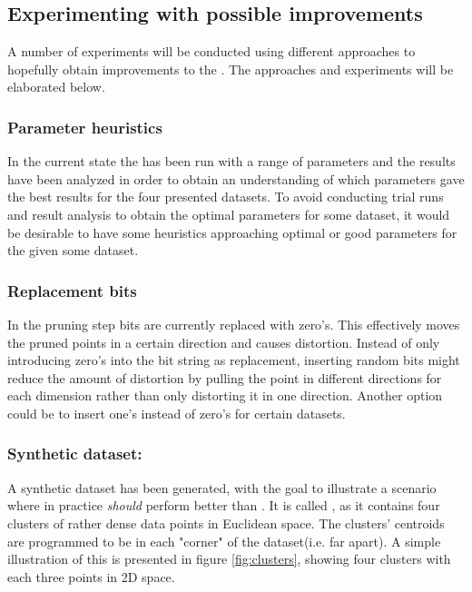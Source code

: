 \subsection{Experimenting with possible improvements}
A number of experiments will be conducted using different approaches to hopefully obtain improvements to the \qs{}. The approaches and experiments will be elaborated below.

\subsubsection{Parameter heuristics}
In the current state the \qs{} has been run with a range of parameters and the results have been analyzed in order to obtain an understanding of which parameters gave the best results for the four presented datasets. To avoid conducting trial runs and result analysis to obtain the optimal parameters for some dataset, it would be desirable to have some heuristics approaching optimal or good parameters for the \qs{} given some dataset.

\subsubsection{Replacement bits}
In the pruning step bits are currently replaced with zero's. This effectively moves the pruned points in a certain direction and causes distortion. Instead of only introducing zero's into the bit string as replacement, inserting random bits might reduce the amount of distortion by pulling the point in different directions for each dimension rather than only distorting it in one direction. Another option could be to insert one's instead of zero's for certain datasets. 


\subsubsection{Synthetic dataset: \clust{}}
A synthetic dataset has been generated, with the goal to illustrate a scenario where \qsr{} in practice \textit{should} perform better than \qs{}. It is called \clust{}, as it contains four clusters of rather dense data points in Euclidean space. The clusters' centroids are programmed to be in each "corner" of the dataset(i.e. far apart). A simple illustration of this is presented in figure \ref{fig:clusters}, showing four clusters with each three points in 2D space.

